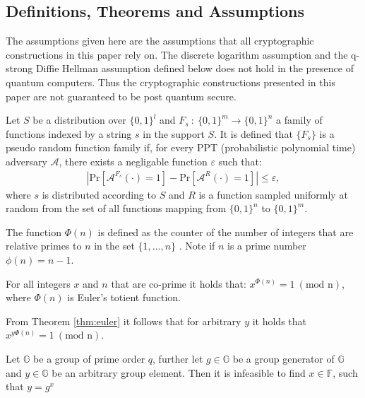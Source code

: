 \subsection*{Definitions, Theorems and Assumptions}
The assumptions given here are the assumptions that all cryptographic constructions in this paper rely on. The discrete logarithm assumption and the q-strong Diffie Hellman assumption defined below does not hold in the presence of quantum computers. Thus the cryptographic constructions presented in this paper are not guaranteed to be post quantum secure. 
\vspace{10pt}
\begin{Mydef}
Let $S$ be a  distribution over $\{0,1\}^l$ and $F_s\: :\: \{0,1\}^m\to\{0,1\}^n$ a family of functions indexed by a string $s$ in the support $S$. It is defined that $\{F_s\}$ is a pseudo random function family if, for every PPT (probabilistic polynomial time) adversary $\mathcal{A}$, there exists a negligable function $\varepsilon$ such that:
\begin{align*}
|\text{Pr}[\mathcal{A}^{F_s}(\cdot) = 1] - \text{Pr}[\mathcal{A}^{R}(\cdot) = 1] | \leq \varepsilon,
\end{align*}
where $s$ is distributed according to $S$ and $R$ is a function sampled uniformly at random from the set of all functions mapping from $\{0,1\}^n$ to $\{0,1\}^m$.
\end{Mydef}
\vspace{10pt}
\begin{Mydef}
The function $\Phi(n)$ is defined as the counter of the number of integers that are relative primes to $n$ in the set $\{1,...,n\}$ . Note if $n$ is a prime number $\phi(n) = n-1$.
\end{Mydef}
\vspace{10pt}
\begin{thm}
\label{thm:euler}
For all integers $x$ and $n$ that are co-prime it holds that:
$x^{\Phi(n)} = 1\:( \text{mod n})$, where $\Phi(n)$ is Euler's totient function.
\end{thm}
\vspace{10pt}
From Theorem \ref{thm:euler} it follows that for arbitrary $y$ it holds that $x^{y\Phi(n)} = 1 \:( \text{mod n})$.
\vspace{10pt}

\begin{Ass}
\label{ass:DLA}
Let $\mathds{G}$ be a group of prime order $q$, further let $g\in \mathds{G}$ be a group generator of $\mathds{G}$ and $y \in\mathds{G}$ be an arbitrary group element. Then it is  infeasible to find $x \in \mathds{F}$, such that $y=g^x$
\end{Ass}

